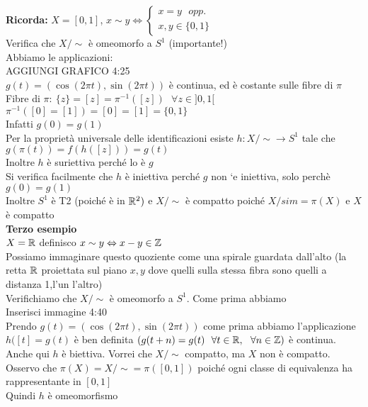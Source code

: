 \documentclass[12px]{article}
\begin{document}
	\textbf{Ricorda:} $X = [0,1]$,  $x\sim y \Leftrightarrow \begin{cases}
		x = y \ \ \ opp.\\
		x,y\in\{0,1\}
	\end{cases}$ \\
	Verifica che $X/\sim$ è omeomorfo a  $S^1$ (importante!) \\
	Abbiamo le applicazioni:\\
	AGGIUNGI GRAFICO 4:25\\
	$g(t) = (\cos(2\pi t),\sin(2\pi t)) $ è continua, ed è costante sulle fibre di $\pi$\\
	Fibre di  $\pi: \ \{z\} = [z] = \pi^{-1}([z])\ \ \ \forall z\in]0,1[$\\
	$\pi^{-1}([0]=[1]) = [0] = [1] = \{0,1\}$\\
	Infatti  $g(0) = g(1)$ \\
	Per la proprietà universale delle identificazioni esiste $h: X/\sim \rightarrow S^1$ tale che $g(\pi(t)) = f(h([z])) = g(t)$ \\
	Inoltre  $h$ è suriettiva perché lo è $g$\\
	Si verifica facilmente che  $h$ è iniettiva perché $g$ non `e iniettiva, solo perchè $g(0) = g(1)$\\
	Inoltre  $S^1$ è T2 (poiché è in $\mathbb{R}^2)$ e  $X/\sim$ è compatto poiché $X/sim = \pi(X)$ e  $X$ è compatto\\
	\textbf{Terzo esempio}\\
	$X = \mathbb{R}$ definisco  $x\sim y \Leftrightarrow x-y\in \mathbb{Z}$\\
	Possiamo immaginare questo quoziente come una spirale guardata dall'alto (la retta $\mathbb{R}$ proiettata sul piano $x,y$ dove quelli sulla stessa fibra sono quelli a distanza 1,l'un l'altro)\\
	 Verifichiamo che $X/\sim$ è omeomorfo a  $S^1$. Come prima abbiamo\\
	 Inserisci immagine 4:40\\
	 Prendo  $g(t) = (\cos(2\pi t), \sin (2 \pi t))$ come prima abbiamo l'applicazione\\
	 $h([t] = g(t)$ è ben definita $(g(t + n) = g(t) \ \ \forall t\in \mathbb{R}, \ \ \forall n\in \mathbb{Z})$ è continua. Anche qui  $h$ è biettiva. Vorrei che $X/\sim$ compatto, ma  $X$ non è compatto.\\
	 Osservo che $\pi(X) = X/\sim = \pi([0,1])$ poiché ogni classe di equivalenza ha rappresentante in  $[0,1]$ \\
	 Quindi $h$ è omeomorfismo\\
\end{document}
